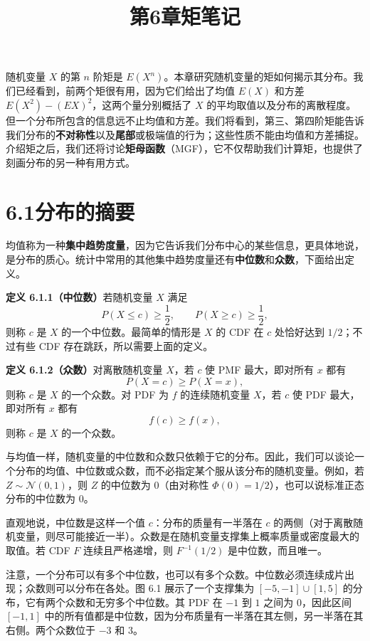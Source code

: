 \documentclass[UTF8,12pt,a4paper,fontset=fandol]{ctexart}
\title{第6章\quad 矩笔记}
\author{}
\date{}
\begin{document}
\maketitle

随机变量 $X$ 的第 $n$ 阶矩是 $E(X^n)$。本章研究随机变量的矩如何揭示其分布。我们已经看到，前两个矩很有用，因为它们给出了均值 $E(X)$ 和方差 $E(X^2)-(EX)^2$，这两个量分别概括了 $X$ 的平均取值以及分布的离散程度。但一个分布所包含的信息远不止均值和方差。我们将看到，第三、第四阶矩能告诉我们分布的\textbf{不对称性}以及\textbf{尾部}或极端值的行为；这些性质不能由均值和方差捕捉。介绍矩之后，我们还将讨论\textbf{矩母函数}（MGF），它不仅帮助我们计算矩，也提供了刻画分布的另一种有用方式。

\section*{6.1\quad 分布的摘要}

均值称为一种\textbf{集中趋势度量}，因为它告诉我们分布中心的某些信息，更具体地说，是分布的质心。统计中常用的其他集中趋势度量还有\textbf{中位数}和\textbf{众数}，下面给出定义。

\noindent\textbf{定义 6.1.1（中位数）}\quad 若随机变量 $X$ 满足
\[
  P(X\le c)\ge \frac12,\qquad P(X\ge c)\ge \frac12,
\]
则称 $c$ 是 $X$ 的一个中位数。最简单的情形是 $X$ 的 CDF 在 $c$ 处恰好达到 $1/2$；不过有些 CDF 存在跳跃，所以需要上面的定义。

\noindent\textbf{定义 6.1.2（众数）}\quad 对离散随机变量 $X$，若 $c$ 使 PMF 最大，即对所有 $x$ 都有
\[
  P(X=c)\ge P(X=x),
\]
则称 $c$ 是 $X$ 的一个众数。对 PDF 为 $f$ 的连续随机变量 $X$，若 $c$ 使 PDF 最大，即对所有 $x$ 都有
\[
  f(c)\ge f(x),
\]
则称 $c$ 是 $X$ 的一个众数。

与均值一样，随机变量的中位数和众数只依赖于它的分布。因此，我们可以谈论一个分布的均值、中位数或众数，而不必指定某个服从该分布的随机变量。例如，若 $Z\sim\mathcal{N}(0,1)$，则 $Z$ 的中位数为 $0$（由对称性 $\Phi(0)=1/2$），也可以说标准正态分布的中位数为 $0$。

直观地说，中位数是这样一个值 $c$：分布的质量有一半落在 $c$ 的两侧（对于离散随机变量，则尽可能接近一半）。众数是在随机变量支撑集上概率质量或密度最大的取值。若 CDF $F$ 连续且严格递增，则 $F^{-1}(1/2)$ 是中位数，而且唯一。

注意，一个分布可以有多个中位数，也可以有多个众数。中位数必须连续成片出现；众数则可以分布在各处。图 6.1 展示了一个支撑集为 $[-5,-1]\cup[1,5]$ 的分布，它有两个众数和无穷多个中位数。其 PDF 在 $-1$ 到 $1$ 之间为 $0$，因此区间 $[-1,1]$ 中的所有值都是中位数，因为分布质量有一半落在其左侧，另一半落在其右侧。两个众数位于 $-3$ 和 $3$。
\end{document}
